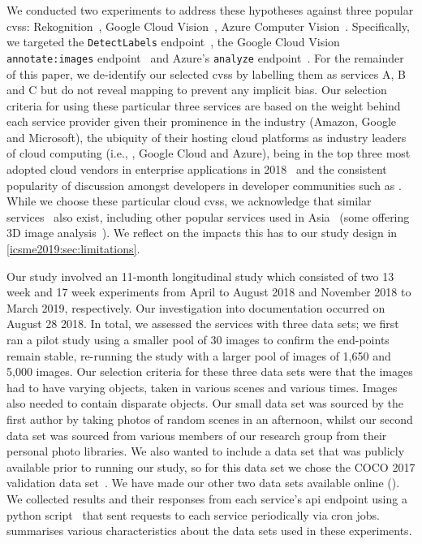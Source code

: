 We conducted two experiments to address these hypotheses against three popular \glspl{cvs}:  Rekognition~, Google Cloud Vision~, Azure Computer Vision~. Specifically, we targeted the  \texttt{DetectLabels} endpoint~, the Google Cloud Vision \texttt{annotate:images} endpoint~ and Azure's \texttt{analyze} endpoint~. For the remainder of this paper, we de-identify our selected \glspl{cvs} by labelling them as services A, B and C but do not reveal mapping to prevent any implicit bias.
Our selection criteria for using these particular three services are based on the weight behind each service provider given their prominence in the industry (Amazon, Google and Microsoft), the ubiquity of their hosting cloud platforms as industry leaders of cloud computing (i.e., , Google Cloud and Azure), being in the top three most adopted cloud vendors in enterprise applications in 2018~\citep{RightScaleInc:2018kJ} and the consistent popularity of discussion amongst developers in developer communities such as . While we choose these particular cloud \glspl{cvs}, we  acknowledge that similar services~ also exist, including other popular services used in Asia~ (some offering 3D image analysis~). We reflect on the impacts this has to our study design in \cref{icsme2019:sec:limitations}.

Our study involved an 11-month longitudinal study which consisted of two 13 week and 17 week experiments from April to August 2018 and November 2018 to March 2019, respectively. Our investigation into documentation occurred on August 28 2018. In total, we assessed the services with three data sets; we first ran a pilot study using a smaller pool of 30 images to confirm the end-points remain stable, re-running the study with a larger pool of images of 1,650 and 5,000 images. Our selection criteria for these three data sets were that the images had to have varying objects, taken in various scenes and various times. Images also needed to contain disparate objects. Our small data set was sourced by the first author by taking photos of random scenes in an afternoon, whilst our second data set was sourced from various members of our research group from their personal photo libraries. We also wanted to include a data set that was publicly available prior to running our study, so for this data set we chose the COCO 2017 validation data set~\citep{Lin:2014vma}. We have made our other two data sets available online (). We collected results and their responses from each service's \gls{api} endpoint  using a  python script~ that sent requests to each service periodically via cron jobs.  summarises various characteristics about the data sets used in these experiments.

